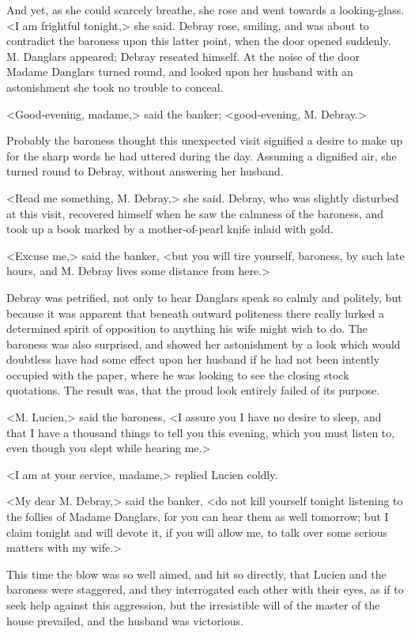 And yet, as she could scarcely breathe, she rose and went towards a looking-glass. <I am frightful tonight,> she said. Debray rose, smiling, and was about to contradict the baroness upon this latter point, when the door opened suddenly. M. Danglars appeared; Debray reseated himself. At the noise of the door Madame Danglars turned round, and looked upon her husband with an astonishment she took no trouble to conceal. 

 <Good-evening, madame,> said the banker; <good-evening, M. Debray.> 

 Probably the baroness thought this unexpected visit signified a desire to make up for the sharp words he had uttered during the day. Assuming a dignified air, she turned round to Debray, without answering her husband. 

 <Read me something, M. Debray,> she said. Debray, who was slightly disturbed at this visit, recovered himself when he saw the calmness of the baroness, and took up a book marked by a mother-of-pearl knife inlaid with gold. 

 <Excuse me,> said the banker, <but you will tire yourself, baroness, by such late hours, and M. Debray lives some distance from here.> 

 Debray was petrified, not only to hear Danglars speak so calmly and politely, but because it was apparent that beneath outward politeness there really lurked a determined spirit of opposition to anything his wife might wish to do. The baroness was also surprised, and showed her astonishment by a look which would doubtless have had some effect upon her husband if he had not been intently occupied with the paper, where he was looking to see the closing stock quotations. The result was, that the proud look entirely failed of its purpose. 

 <M. Lucien,> said the baroness, <I assure you I have no desire to sleep, and that I have a thousand things to tell you this evening, which you must listen to, even though you slept while hearing me.> 

 <I am at your service, madame,> replied Lucien coldly. 

 <My dear M. Debray,> said the banker, <do not kill yourself tonight listening to the follies of Madame Danglars, for you can hear them as well tomorrow; but I claim tonight and will devote it, if you will allow me, to talk over some serious matters with my wife.> 

 This time the blow was so well aimed, and hit so directly, that Lucien and the baroness were staggered, and they interrogated each other with their eyes, as if to seek help against this aggression, but the irresistible will of the master of the house prevailed, and the husband was victorious. 

